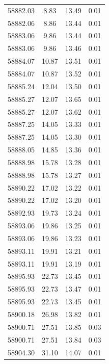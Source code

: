 \begin{longtable}{|c|c|c|c|}
 58882.03 &    8.83 &       13.49 &          0.01 \\
 58882.06 &    8.86 &       13.44 &          0.01 \\
 58883.06 &    9.86 &       13.44 &          0.01 \\
 58883.06 &    9.86 &       13.46 &          0.01 \\
 58884.07 &   10.87 &       13.51 &          0.01 \\
 58884.07 &   10.87 &       13.52 &          0.01 \\
 58885.24 &   12.04 &       13.50 &          0.01 \\
 58885.27 &   12.07 &       13.65 &          0.01 \\
 58885.27 &   12.07 &       13.62 &          0.01 \\
 58887.25 &   14.05 &       13.33 &          0.01 \\
 58887.25 &   14.05 &       13.30 &          0.01 \\
 58888.05 &   14.85 &       13.36 &          0.01 \\
 58888.98 &   15.78 &       13.28 &          0.01 \\
 58888.98 &   15.78 &       13.27 &          0.01 \\
 58890.22 &   17.02 &       13.22 &          0.01 \\
 58890.22 &   17.02 &       13.20 &          0.01 \\
 58892.93 &   19.73 &       13.24 &          0.01 \\
 58893.06 &   19.86 &       13.25 &          0.01 \\
 58893.06 &   19.86 &       13.23 &          0.01 \\
 58893.11 &   19.91 &       13.21 &          0.01 \\
 58893.11 &   19.91 &       13.19 &          0.01 \\
 58895.93 &   22.73 &       13.45 &          0.01 \\
 58895.93 &   22.73 &       13.47 &          0.01 \\
 58895.93 &   22.73 &       13.45 &          0.01 \\
 58900.18 &   26.98 &       13.82 &          0.01 \\
 58900.71 &   27.51 &       13.85 &          0.03 \\
 58900.71 &   27.51 &       13.84 &          0.03 \\
 58904.30 &   31.10 &       14.07 &          0.01 \\

\end{longtable}
